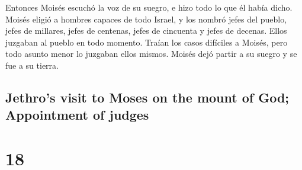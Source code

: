 \begin{paracol}{2}
 Entonces Moisés escuchó la voz de su suegro, e hizo todo
lo que él había dicho.  Moisés eligió a hombres capaces
de todo Israel, y los nombró jefes del pueblo, jefes de millares, jefes
de centenas, jefes de cincuenta y jefes de decenas. 
Ellos juzgaban al pueblo en todo momento. Traían los casos difíciles a
Moisés, pero todo asunto menor lo juzgaban ellos mismos. 
Moisés dejó partir a su suegro y se fue a su tierra.

\switchcolumn
\begin{otherlanguage}{english}

\hypertarget{jethros-visit-to-moses-on-the-mount-of-god-appointment-of-judges}{%
\subsection{Jethro's visit to Moses on the mount of God; Appointment of
judges}\label{jethros-visit-to-moses-on-the-mount-of-god-appointment-of-judges}}

\hypertarget{section-35}{%
\section{18}\label{section-35}}


\end{otherlanguage}
\end{paracol}
